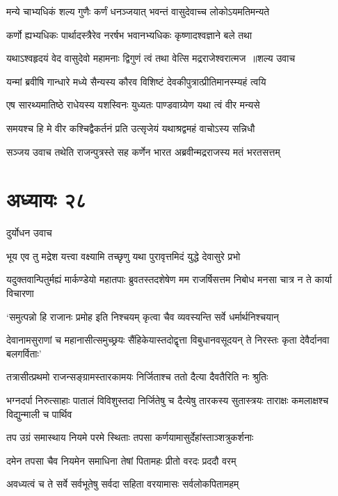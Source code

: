 \twolineshloka
{मन्ये चाभ्यधिकं शल्य गुणैः कर्णं धनञ्जयात्}
{भवन्तं वासुदेवाच्च लोकोऽयमतिमन्यते}


\twolineshloka
{कर्णो ह्यभ्यधिकः पार्थादस्त्रैरेव नरर्षभ}
{भवानभ्यधिकः कृष्णादश्वज्ञाने बले तथा}


\threelineshloka
{यथाऽश्वहृदयं वेद वासुदेवो महामनाः}
{द्विगुणं त्वं तथा वेत्सि मद्रराजेश्वरात्मज ॥शल्य उवाच}
{}


\twolineshloka
{यन्मां ब्रवीषि गान्धारे मध्ये सैन्यस्य कौरव}
{विशिष्टं देवकीपुत्रात्प्रीतिमानस्म्यहं त्वयि}


\twolineshloka
{एष सारथ्यमातिष्ठे राधेयस्य यशस्विनः}
{युध्यतः पाण्डवाग्र्येण यथा त्वं वीर मन्यसे}


\twolineshloka
{समयश्च हि मे वीर कश्चिद्वैकर्तनं प्रति}
{उत्सृजेयं यथाश्रद्वमहं वाचोऽस्य सन्निधौ}


\threelineshloka
{सञ्जय उवाच}
{तथेति राजन्पुत्रस्ते सह कर्णेन भारत}
{अब्रवीन्मद्रराजस्य मतं भरतसत्तम्}


\chapter{अध्यायः २८}
\twolineshloka
{दुर्योधन उवाच}
{}


\twolineshloka
{भूय एव तु मद्रेश यत्त्वा वक्ष्यामि तच्छृणु}
{यथा पुरावृत्तमिदं युद्धे देवासुरे प्रभो}


\threelineshloka
{यदुक्तवान्पितुर्मह्यं मार्कण्डेयो महातपाः}
{ब्रुवतस्तदशेषेण मम राजर्षिसत्तम}
{निबोध मनसा चात्र न ते कार्या विचारणा}


\twolineshloka
{`समुत्पन्नो हि राजानः प्रमोह इति निश्चयम्}
{कृत्वा चैव व्यवस्यन्ति सर्वे धर्मार्थनिश्चयान्}


\threelineshloka
{देवानामसुराणां च महानासीत्समुच्छ्रयः}
{सैंहिकेयास्तदोद्वृत्ता विबुधानवसूदयन्}
{ते निरस्तः कृता देवैर्दानवा बलगर्विताः'}


\twolineshloka
{तत्रासीत्प्रथमो राजन्सङ्ग्रामस्तारकामयः}
{निर्जिताश्च ततो दैत्या दैवतैरिति नः श्रुतिः}


भग्नदर्पा निरुत्साहाः पातालं विविशुस्तदा
\twolineshloka
{निर्जितेषु च दैत्येषु तारकस्य सुतास्त्रयः}
{ताराक्षः कमलाक्षश्च विद्युन्माली च पार्थिव}


\twolineshloka
{तप उग्रं समास्थाय नियमे परमे स्थिताः}
{तपसा कर्णयामासुर्देहांस्ताञ्शत्रुकर्शनाः}


\twolineshloka
{दमेन तपसा चैव नियमेन समाधिना}
{तेषां पितामहः प्रीतो वरदः प्रददौ वरम्}


\twolineshloka
{अवध्यत्वं च ते सर्वे सर्वभूतेषु सर्वदा}
{सहिता वरयामासः सर्वलोकपितामहम्}


